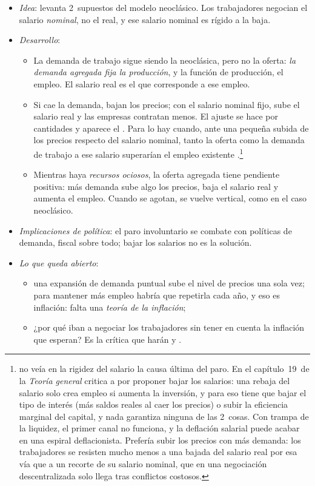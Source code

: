 \documentclass[11pt]{article}
\begin{document}
\begin{itemize}
\item \emph{Idea}: \textcite{Keynes1936} levanta 2~supuestos del modelo neoclásico. Los trabajadores negocian el salario \emph{nominal}, no el real, y ese salario nominal es rígido a la baja.
\item \emph{Desarrollo}:
  \begin{itemize}
  \item La demanda de trabajo sigue siendo la neoclásica, pero no la oferta: \emph{la demanda agregada fija la producción}, y la función de producción, el empleo. El salario real es el que corresponde a ese empleo.
  \item Si cae la demanda, bajan los precios; con el salario nominal fijo, sube el salario real y las empresas contratan menos. El ajuste se hace por cantidades y aparece el . Para  lo hay cuando, ante una pequeña subida de los precios respecto del salario nominal, tanto la oferta como la demanda de trabajo a ese salario superarían el empleo existente\nocite{Keynes1936} .\footnote{ no veía en la rigidez del salario la causa última del paro. En el capítulo~19~de la \emph{Teoría general} critica a  por proponer bajar los salarios: una rebaja del salario solo crea empleo si aumenta la inversión, y para eso tiene que bajar el tipo de interés (más saldos reales al caer los precios) o subir la eficiencia marginal del capital, y nada garantiza ninguna de las 2~cosas. Con trampa de la liquidez, el primer canal no funciona, y la deflación salarial puede acabar en una espiral deflacionista. Prefería subir los precios con más demanda: los trabajadores se resisten mucho menos a una bajada del salario real por esa vía que a un recorte de su salario nominal, que en una negociación descentralizada solo llega tras conflictos costosos.}
  \item Mientras haya \emph{recursos ociosos}, la oferta agregada tiene pendiente positiva: más demanda sube algo los precios, baja el salario real y aumenta el empleo. Cuando se agotan, se vuelve vertical, como en el caso neoclásico.
  \end{itemize}
\item \emph{Implicaciones de política}: el paro involuntario se combate con políticas de demanda, fiscal sobre todo; bajar los salarios no es la solución.
\item \emph{Lo que queda abierto}:
  \begin{itemize}
  \item una expansión de demanda puntual sube el nivel de precios una sola vez; para mantener más empleo habría que repetirla cada año, y eso es inflación: falta una \emph{teoría de la inflación};
  \item ¿por qué iban a negociar los trabajadores sin tener en cuenta la inflación que esperan? Es la crítica que harán  y .
  \end{itemize}
\end{itemize}
\end{document}
